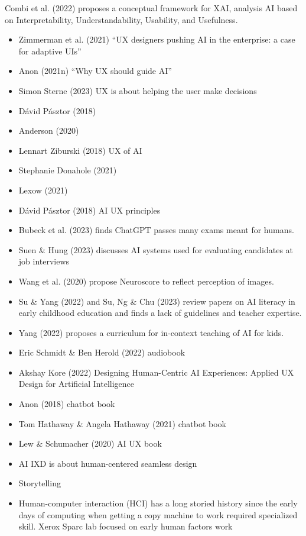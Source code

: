 \documentclass[
  letterpaper,
  DIV=11,
  numbers=noendperiod]{scrartcl}
\begin{document}
Combi et al. (2022) proposes a conceptual framework for XAI, analysis AI
based on Interpretability, Understandability, Usability, and Usefulness.

\begin{itemize}
\item
  Zimmerman et al. (2021) ``UX designers pushing AI in the enterprise: a
  case for adaptive UIs''
\item
  Anon (2021n) ``Why UX should guide AI''
\item
  Simon Sterne (2023) UX is about helping the user make decisions
\item
  Dávid Pásztor (2018)
\item
  Anderson (2020)
\item
  Lennart Ziburski (2018) UX of AI
\item
  Stephanie Donahole (2021)
\item
  Lexow (2021)
\item
  Dávid Pásztor (2018) AI UX principles
\item
  Bubeck et al. (2023) finds ChatGPT passes many exams meant for humans.
\item
  Suen \& Hung (2023) discusses AI systems used for evaluating
  candidates at job interviews
\item
  Wang et al. (2020) propose Neuroscore to reflect perception of images.
\item
  Su \& Yang (2022) and Su, Ng \& Chu (2023) review papers on AI
  literacy in early childhood education and finds a lack of guidelines
  and teacher expertise.
\item
  Yang (2022) proposes a curriculum for in-context teaching of AI for
  kids.
\item
  Eric Schmidt \& Ben Herold (2022) audiobook
\item
  Akshay Kore (2022) Designing Human-Centric AI Experiences: Applied UX
  Design for Artificial Intelligence
\item
  Anon (2018) chatbot book
\item
  Tom Hathaway \& Angela Hathaway (2021) chatbot book
\item
  Lew \& Schumacher (2020) AI UX book
\item
  AI IXD is about human-centered seamless design
\item
  Storytelling
\item
  Human-computer interaction (HCI) has a long storied history since the
  early days of computing when getting a copy machine to work required
  specialized skill. Xerox Sparc lab focused on early human factors work

\end{itemize}
\end{document}
